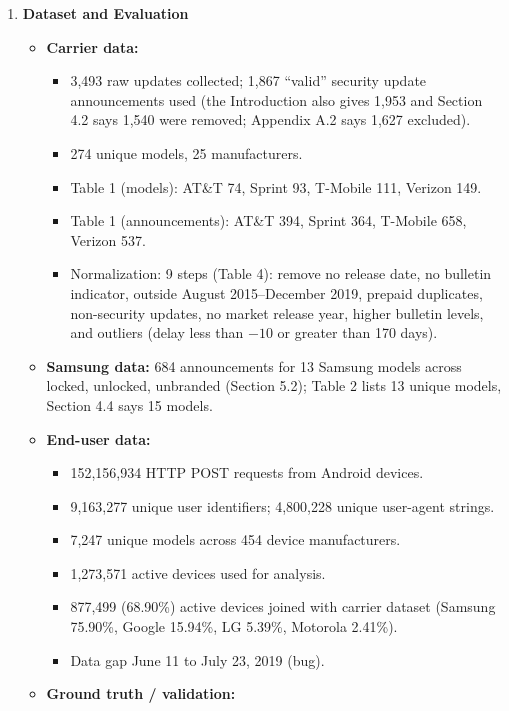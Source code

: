 \documentclass[11pt,a4paper]{article}
\newcommand{\entrypart}[1]{\textbf{\color{accent}#1}\par\vspace{2pt}}
\begin{document}
\begin{enumerate}
    \item \entrypart{Dataset and Evaluation}
    \begin{itemize}[leftmargin=*, itemsep=1pt, topsep=2pt]
        \item \textbf{Carrier data:}
        \begin{itemize}[itemsep=0pt]
            \item 3,493 raw updates collected; 1,867 ``valid'' security update announcements used (the Introduction also gives 1,953 and Section 4.2 says 1,540 were removed; Appendix A.2 says 1,627 excluded).
            \item 274 unique models, 25 manufacturers.
            \item Table 1 (models): AT\&T 74, Sprint 93, T-Mobile 111, Verizon 149.
            \item Table 1 (announcements): AT\&T 394, Sprint 364, T-Mobile 658, Verizon 537.
            \item Normalization: 9 steps (Table 4): remove no release date, no bulletin indicator, outside August 2015--December 2019, prepaid duplicates, non-security updates, no market release year, higher bulletin levels, and outliers (delay less than $-10$ or greater than 170 days).
        \end{itemize}
        \item \textbf{Samsung data:} 684 announcements for 13 Samsung models across locked, unlocked, unbranded (Section 5.2); Table 2 lists 13 unique models, Section 4.4 says 15 models.
        \item \textbf{End-user data:}
        \begin{itemize}[itemsep=0pt]
            \item 152,156,934 HTTP POST requests from Android devices.
            \item 9,163,277 unique user identifiers; 4,800,228 unique user-agent strings.
            \item 7,247 unique models across 454 device manufacturers.
            \item 1,273,571 active devices used for analysis.
            \item 877,499 (68.90\%) active devices joined with carrier dataset (Samsung 75.90\%, Google 15.94\%, LG 5.39\%, Motorola 2.41\%).
            \item Data gap June 11 to July 23, 2019 (bug).
        \end{itemize}
        \item \textbf{Ground truth / validation:}
        \begin{itemize}[itemsep=0pt]

\end{itemize}
\end{itemize}
\end{enumerate}
\end{document}
